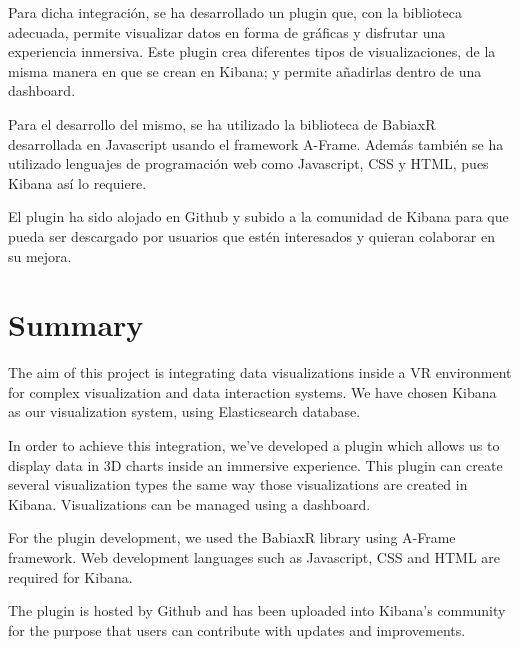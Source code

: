 \documentclass[a4paper, 12pt]{book}
\begin{document}
Para dicha integración, se ha desarrollado un plugin que, con la biblioteca adecuada, permite visualizar datos en forma de gráficas y disfrutar una experiencia inmersiva. Este plugin crea diferentes tipos de visualizaciones, de la misma manera en que se crean en Kibana; y permite añadirlas dentro de una dashboard.

Para el desarrollo del mismo, se ha utilizado la biblioteca de BabiaxR desarrollada en Javascript usando el framework A-Frame. Además también se ha utilizado lenguajes de programación web como Javascript, CSS y HTML, pues Kibana así lo requiere.

El plugin ha sido alojado en Github y subido a la comunidad de Kibana para que pueda ser descargado por usuarios que estén interesados y quieran colaborar en su mejora.



\chapter*{Summary}

The aim of this project is integrating data visualizations inside a VR environment for complex visualization and data interaction systems. We have chosen Kibana as our visualization system, using Elasticsearch database.

In order to achieve this integration, we’ve developed a plugin which allows us to display data in 3D charts inside an immersive experience. This plugin can create several visualization types the same way those visualizations are created in Kibana. Visualizations can be managed using a dashboard.

For the plugin development, we used the BabiaxR library using A-Frame framework. Web development languages such as Javascript, CSS and HTML are required for Kibana.

The plugin is hosted by Github and has been uploaded into Kibana’s community for the purpose that users can contribute with updates and improvements.




\tableofcontents
\cleardoublepage
\listoffigures %
\end{document}
